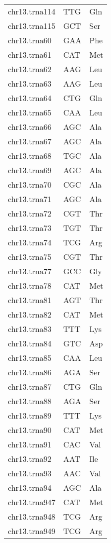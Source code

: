 \begin{longtable}{@{}l>{\collectcell\anticodon}l<{\endcollectcell}l@{}}
    chr13.trna114 & TTG & Gln \\
    chr13.trna115 & GCT & Ser \\
    chr13.trna60 & GAA & Phe \\
    chr13.trna61 & CAT & Met \\
    chr13.trna62 & AAG & Leu \\
    chr13.trna63 & AAG & Leu \\
    chr13.trna64 & CTG & Gln \\
    chr13.trna65 & CAA & Leu \\
    chr13.trna66 & AGC & Ala \\
    chr13.trna67 & AGC & Ala \\
    chr13.trna68 & TGC & Ala \\
    chr13.trna69 & AGC & Ala \\
    chr13.trna70 & CGC & Ala \\
    chr13.trna71 & AGC & Ala \\
    chr13.trna72 & CGT & Thr \\
    chr13.trna73 & TGT & Thr \\
    chr13.trna74 & TCG & Arg \\
    chr13.trna75 & CGT & Thr \\
    chr13.trna77 & GCC & Gly \\
    chr13.trna78 & CAT & Met \\
    chr13.trna81 & AGT & Thr \\
    chr13.trna82 & CAT & Met \\
    chr13.trna83 & TTT & Lys \\
    chr13.trna84 & GTC & Asp \\
    chr13.trna85 & CAA & Leu \\
    chr13.trna86 & AGA & Ser \\
    chr13.trna87 & CTG & Gln \\
    chr13.trna88 & AGA & Ser \\
    chr13.trna89 & TTT & Lys \\
    chr13.trna90 & CAT & Met \\
    chr13.trna91 & CAC & Val \\
    chr13.trna92 & AAT & Ile \\
    chr13.trna93 & AAC & Val \\
    chr13.trna94 & AGC & Ala \\
    chr13.trna947 & CAT & Met \\
    chr13.trna948 & TCG & Arg \\
    chr13.trna949 & TCG & Arg \\

\end{longtable}
